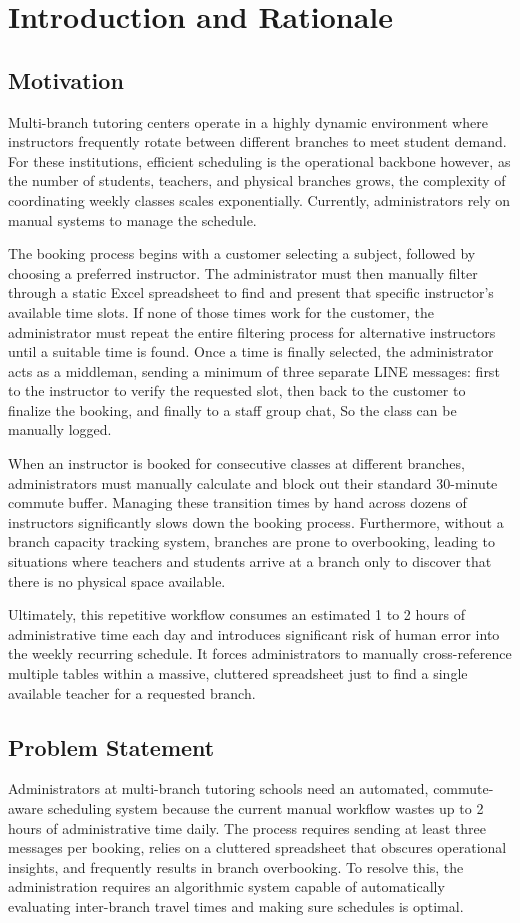 \newpage
\section{Introduction and Rationale}
\subsection{Motivation}
Multi-branch tutoring centers operate in a highly dynamic environment where instructors frequently rotate between different branches to meet student demand. For these institutions, efficient scheduling is the operational backbone however, as the number of students, teachers, and physical branches grows, the complexity of coordinating weekly classes scales exponentially. Currently, administrators rely on manual systems to manage the schedule.

The booking process begins with a customer selecting a subject, followed by choosing a preferred instructor. The administrator must then manually filter through a static Excel spreadsheet to find and present that specific instructor's available time slots. If none of those times work for the customer, the administrator must repeat the entire filtering process for alternative instructors until a suitable time is found. Once a time is finally selected, the administrator acts as a middleman, sending a minimum of three separate LINE messages: first to the instructor to verify the requested slot, then back to the customer to finalize the booking, and finally to a staff group chat, So the class can be manually logged.

When an instructor is booked for consecutive classes at different branches, administrators must manually calculate and block out their standard 30-minute commute buffer. Managing these transition times by hand across dozens of instructors significantly slows down the booking process. Furthermore, without a branch capacity tracking system, branches are prone to overbooking, leading to situations where teachers and students arrive at a branch only to discover that there is no physical space available.

Ultimately, this repetitive workflow consumes an estimated 1 to 2 hours of administrative time each day and introduces significant risk of human error into the weekly recurring schedule. It forces administrators to manually cross-reference multiple tables within a massive, cluttered spreadsheet just to find a single available teacher for a requested branch.
\subsection{Problem Statement}
Administrators at multi-branch tutoring schools need an automated, commute-aware scheduling system because the current manual workflow wastes up to 2 hours of administrative time daily. The process requires sending at least three messages per booking, relies on a cluttered spreadsheet that obscures operational insights, and frequently results in branch overbooking. To resolve this, the administration requires an algorithmic system capable of automatically evaluating inter-branch travel times and making sure schedules is optimal.

